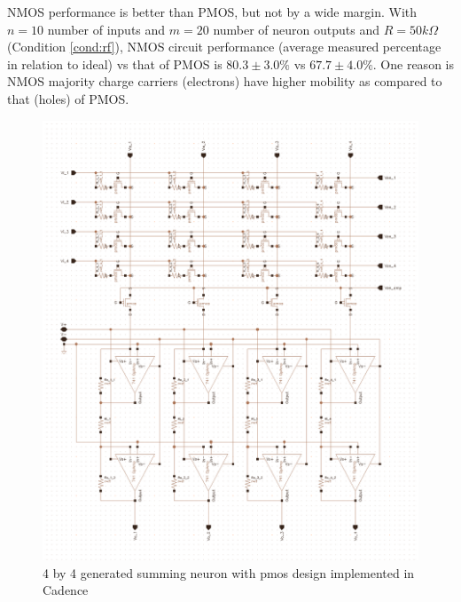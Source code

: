 NMOS performance is better than PMOS, but not by a wide margin. With $n = 10$ number of inputs and $m = 20$ number of neuron outputs and $R=50k\Omega$ (Condition \ref{cond:rf}), NMOS circuit performance (average measured percentage in relation to ideal) vs that of PMOS is $80.3\pm3.0\%
$ vs $67.7\pm4.0\%$. One reason is NMOS majority charge carriers (electrons) have higher mobility as compared to that (holes) of PMOS.
\begin{figure}[H]
	\centering
	\includegraphics[scale=0.5]{version2.png}
	\caption{4 by 4 generated summing neuron with pmos design implemented in Cadence}
	\label{fig:pmosscaled}
\end{figure}
